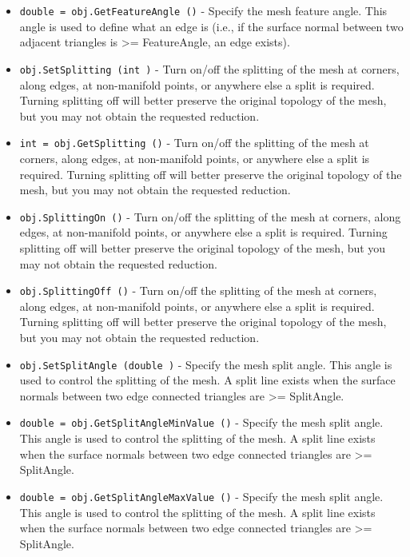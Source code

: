 \begin{itemize}
\item  \verb|double = obj.GetFeatureAngle ()| -  Specify the mesh feature angle. This angle is used to define what
 an edge is (i.e., if the surface normal between two adjacent triangles
 is >= FeatureAngle, an edge exists).

\item  \verb|obj.SetSplitting (int )| -  Turn on/off the splitting of the mesh at corners, along edges, at
 non-manifold points, or anywhere else a split is required. Turning 
 splitting off will better preserve the original topology of the
 mesh, but you may not obtain the requested reduction.

\item  \verb|int = obj.GetSplitting ()| -  Turn on/off the splitting of the mesh at corners, along edges, at
 non-manifold points, or anywhere else a split is required. Turning 
 splitting off will better preserve the original topology of the
 mesh, but you may not obtain the requested reduction.

\item  \verb|obj.SplittingOn ()| -  Turn on/off the splitting of the mesh at corners, along edges, at
 non-manifold points, or anywhere else a split is required. Turning 
 splitting off will better preserve the original topology of the
 mesh, but you may not obtain the requested reduction.

\item  \verb|obj.SplittingOff ()| -  Turn on/off the splitting of the mesh at corners, along edges, at
 non-manifold points, or anywhere else a split is required. Turning 
 splitting off will better preserve the original topology of the
 mesh, but you may not obtain the requested reduction.

\item  \verb|obj.SetSplitAngle (double )| -  Specify the mesh split angle. This angle is used to control the splitting
 of the mesh. A split line exists when the surface normals between
 two edge connected triangles are >= SplitAngle.

\item  \verb|double = obj.GetSplitAngleMinValue ()| -  Specify the mesh split angle. This angle is used to control the splitting
 of the mesh. A split line exists when the surface normals between
 two edge connected triangles are >= SplitAngle.

\item  \verb|double = obj.GetSplitAngleMaxValue ()| -  Specify the mesh split angle. This angle is used to control the splitting
 of the mesh. A split line exists when the surface normals between
 two edge connected triangles are >= SplitAngle.


\end{itemize}
